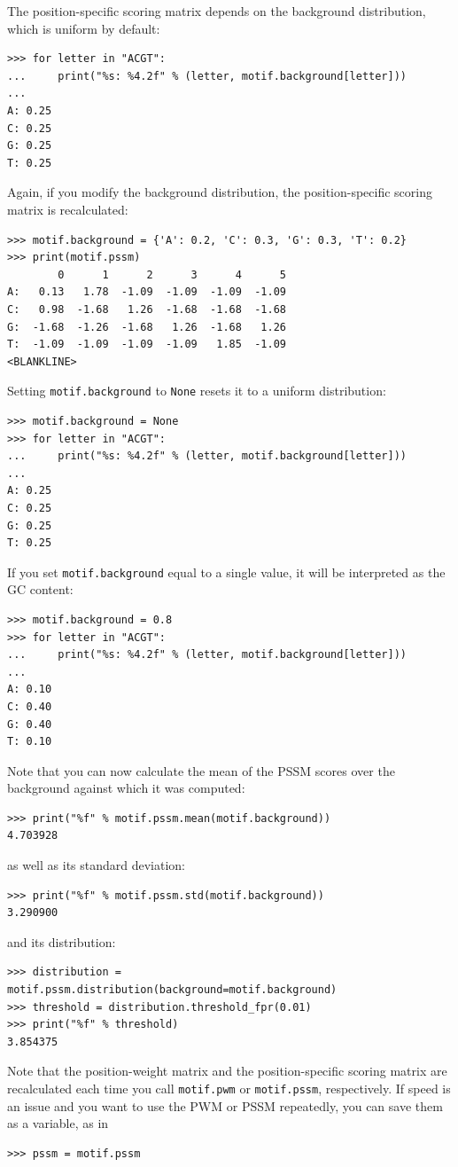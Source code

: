 \documentclass{report}
\begin{document}
The position-specific scoring matrix depends on the background distribution, which is uniform by default:
\begin{verbatim}
>>> for letter in "ACGT":
...     print("%s: %4.2f" % (letter, motif.background[letter]))
... 
A: 0.25
C: 0.25
G: 0.25
T: 0.25
\end{verbatim}
Again, if you modify the background distribution, the position-specific scoring matrix is recalculated:
\begin{verbatim}
>>> motif.background = {'A': 0.2, 'C': 0.3, 'G': 0.3, 'T': 0.2}
>>> print(motif.pssm)
        0      1      2      3      4      5
A:   0.13   1.78  -1.09  -1.09  -1.09  -1.09
C:   0.98  -1.68   1.26  -1.68  -1.68  -1.68
G:  -1.68  -1.26  -1.68   1.26  -1.68   1.26
T:  -1.09  -1.09  -1.09  -1.09   1.85  -1.09
<BLANKLINE>
\end{verbatim}
Setting \verb+motif.background+ to \verb+None+ resets it to a uniform distribution:
\begin{verbatim}
>>> motif.background = None
>>> for letter in "ACGT":
...     print("%s: %4.2f" % (letter, motif.background[letter]))
... 
A: 0.25
C: 0.25
G: 0.25
T: 0.25
\end{verbatim}
If you set \verb+motif.background+ equal to a single value, it will be interpreted as the GC content:
\begin{verbatim}
>>> motif.background = 0.8
>>> for letter in "ACGT":
...     print("%s: %4.2f" % (letter, motif.background[letter]))
... 
A: 0.10
C: 0.40
G: 0.40
T: 0.10
\end{verbatim}
Note that you can now calculate the mean of the PSSM scores over the background against which it was computed:
\begin{verbatim}
>>> print("%f" % motif.pssm.mean(motif.background))
4.703928
\end{verbatim}
as well as its standard deviation:
\begin{verbatim}
>>> print("%f" % motif.pssm.std(motif.background))
3.290900
\end{verbatim}
and its distribution:
\begin{verbatim}
>>> distribution = motif.pssm.distribution(background=motif.background)
>>> threshold = distribution.threshold_fpr(0.01)
>>> print("%f" % threshold)
3.854375
\end{verbatim}

Note that the position-weight matrix and the position-specific scoring matrix are recalculated each time you call \verb+motif.pwm+ or \verb+motif.pssm+, respectively. If speed is an issue and you want to use the PWM or PSSM repeatedly, you can save them as a variable, as in
\begin{verbatim}
>>> pssm = motif.pssm
\end{verbatim}
\end{document}
